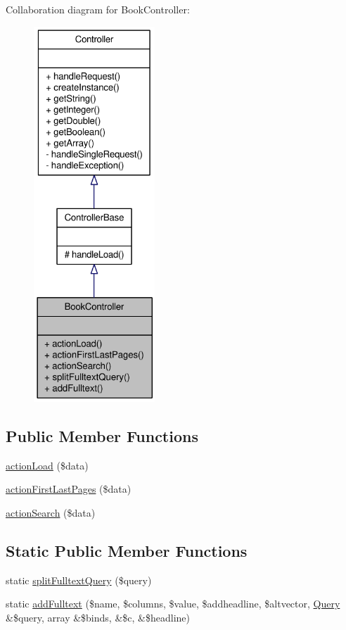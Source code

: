 Collaboration diagram for BookController:\nopagebreak
\begin{figure}[H]
\begin{center}
\leavevmode
\includegraphics[height=400pt]{classBookController__coll__graph}
\end{center}
\end{figure}
\subsection*{Public Member Functions}
\begin{DoxyCompactItemize}
\item 
\hyperlink{classBookController_a6079dc1106ff410904978d50ca8d34a9}{actionLoad} (\$data)
\item 
\hyperlink{classBookController_a171e02784e1684da6151682bfd76d850}{actionFirstLastPages} (\$data)
\item 
\hyperlink{classBookController_a4504f609c873130b89fe8849621ea65e}{actionSearch} (\$data)
\end{DoxyCompactItemize}
\subsection*{Static Public Member Functions}
\begin{DoxyCompactItemize}
\item 
static \hyperlink{classBookController_adcf3d57be7a34444cb044754d5e11cb4}{splitFulltextQuery} (\$query)
\item 
static \hyperlink{classBookController_a633024b63ec6ba13730a6d7852fc2637}{addFulltext} (\$name, \$columns, \$value, \$addheadline, \$altvector, \hyperlink{classQuery}{Query} \&\$query, array \&\$binds, \&\$c, \&\$headline)
\end{DoxyCompactItemize}


